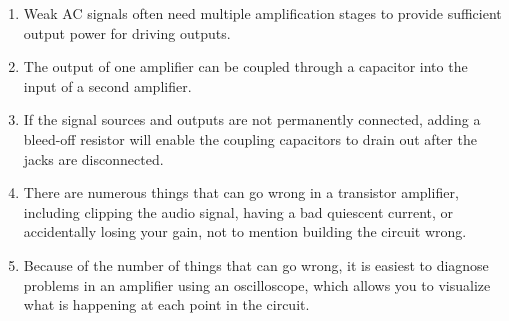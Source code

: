 \begin{enumerate}
\item Weak AC signals often need multiple amplification stages to provide sufficient output power for driving outputs.
\item The output of one amplifier can be coupled through a capacitor into the input of a second amplifier.
\item If the signal sources and outputs are not permanently connected, adding a bleed-off resistor will enable the coupling capacitors to drain out after the jacks are disconnected.
\item There are numerous things that can go wrong in a transistor amplifier, including clipping the audio signal, having a bad quiescent current, or accidentally losing your gain, not to mention building the circuit wrong.
\item Because of the number of things that can go wrong, it is easiest to diagnose problems in an amplifier using an oscilloscope, which allows you to visualize what is happening at each point in the circuit.
\end{enumerate}

\applysection


